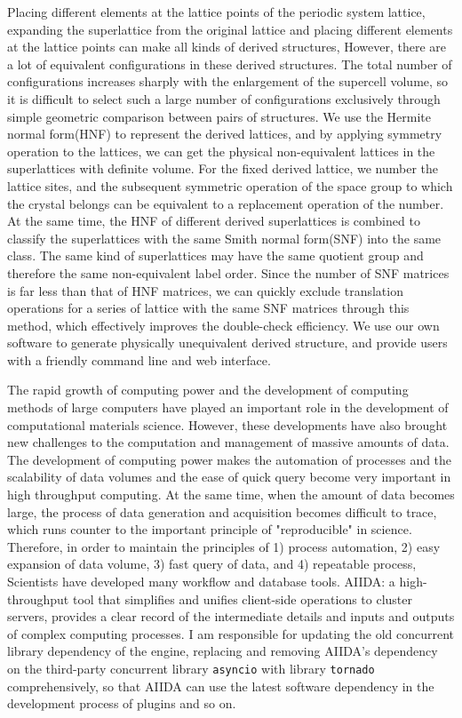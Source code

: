 \documentclass[phd,nobackinfo]{scutthesis}
\begin{document}
\begin{englishabstract}
Placing different elements at the lattice points of the periodic system lattice, expanding the superlattice from the original lattice and placing different elements at the lattice points can make all kinds of derived structures,
However, there are a lot of equivalent configurations in these derived structures.
The total number of configurations increases sharply with the enlargement of the supercell volume, so it is difficult to select such a large number of configurations exclusively through simple geometric comparison between pairs of structures.
We use the Hermite normal form(HNF) to represent the derived lattices, and by applying symmetry operation to the lattices, we can get the physical non-equivalent lattices in the superlattices with definite volume. For the fixed derived lattice, we number the lattice sites, and the subsequent symmetric operation of the space group to which the crystal belongs can be equivalent to a replacement operation of the number. At the same time, the HNF of different derived superlattices is combined to classify the superlattices with the same Smith normal form(SNF) into the same class. The same kind of superlattices may have the same quotient group and therefore the same non-equivalent label order. Since the number of SNF matrices is far less than that of HNF matrices, we can quickly exclude translation operations for a series of lattice with the same SNF matrices through this method, which effectively improves the double-check efficiency.
We use our own software to generate physically unequivalent derived structure, and provide users with a friendly command line and web interface.

The rapid growth of computing power and the development of computing methods of large computers have played an important role in the development of computational materials science.
However, these developments have also brought new challenges to the computation and management of massive amounts of data.
The development of computing power makes the automation of processes and the scalability of data volumes and the ease of quick query become very important in high throughput computing.
At the same time, when the amount of data becomes large, the process of data generation and acquisition becomes difficult to trace, which runs counter to the important principle of "reproducible" in science.
Therefore, in order to maintain the principles of 1) process automation, 2) easy expansion of data volume, 3) fast query of data, and 4) repeatable process,
Scientists have developed many workflow and database tools. AIIDA: a high-throughput tool that simplifies and unifies client-side operations to cluster servers, provides a clear record of the intermediate details and inputs and outputs of complex computing processes.
I am responsible for updating the old concurrent library dependency of the engine, replacing and removing AIIDA's dependency on the third-party concurrent library \texttt{asyncio} with library \texttt{tornado} comprehensively, so that AIIDA can use the latest software dependency in the development process of plugins and so on.


\end{englishabstract}
\end{document}
